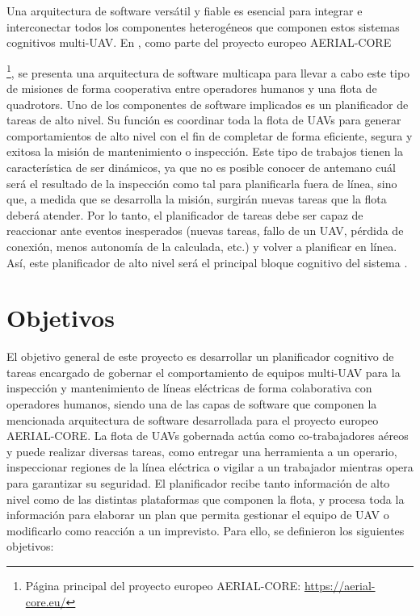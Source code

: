 \documentclass[fontsize=11pt, English=false, Español=true, Myfinal=true, twoside, numbers=noenddot]{scrbook}
\begin{document}
Una arquitectura de software versátil y fiable es esencial para integrar e interconectar todos los componentes heterogéneos que componen estos sistemas cognitivos multi-\gls{UAV}. En \cite{AerialCoreMulti-Layer}, como parte del proyecto europeo AERIAL-CORE{\footnote{Página principal del proyecto europeo AERIAL-CORE: \url{https://aerial-core.eu/}}, se presenta una arquitectura de software multicapa para llevar a cabo este tipo de misiones de forma cooperativa entre operadores humanos y una flota de quadrotors. Uno de los componentes de software implicados es un planificador de tareas de alto nivel. Su función es coordinar toda la flota de \glspl{UAV} para generar comportamientos de alto nivel con el fin de completar de forma eficiente, segura y exitosa la misión de mantenimiento o inspección. Este tipo de trabajos tienen la característica de ser dinámicos, ya que no es posible conocer de antemano cuál será el resultado de la inspección como tal para planificarla fuera de línea, sino que, a medida que se desarrolla la misión, surgirán nuevas tareas que la flota deberá atender. Por lo tanto, el planificador de tareas debe ser capaz de reaccionar ante eventos inesperados (nuevas tareas, fallo de un \gls{UAV}, pérdida de conexión, menos autonomía de la calculada, etc.) y volver a planificar en línea. Así, este planificador de alto nivel será el principal bloque cognitivo del sistema \cite{AerialCoreMulti-Layer}.

\section{Objetivos}
\label{sec:Objectives}
El objetivo general de este proyecto es desarrollar un planificador cognitivo de tareas encargado de gobernar el comportamiento de equipos multi-\gls{UAV} para la inspección y mantenimiento de líneas eléctricas de forma colaborativa con operadores humanos, siendo una de las capas de software que componen la mencionada arquitectura de software \cite{AerialCoreMulti-Layer} desarrollada para el proyecto europeo AERIAL-CORE. La flota de \glspl{UAV} gobernada actúa como co-trabajadores aéreos y puede realizar diversas tareas, como entregar una herramienta a un operario, inspeccionar regiones de la línea eléctrica o vigilar a un trabajador mientras opera para garantizar su seguridad. El planificador recibe tanto información de alto nivel como de las distintas plataformas que componen la flota, y procesa toda la información para elaborar un plan que permita gestionar el equipo de \gls{UAV} o modificarlo como reacción a un imprevisto. Para ello, se definieron los siguientes objetivos:

}
\end{document}
